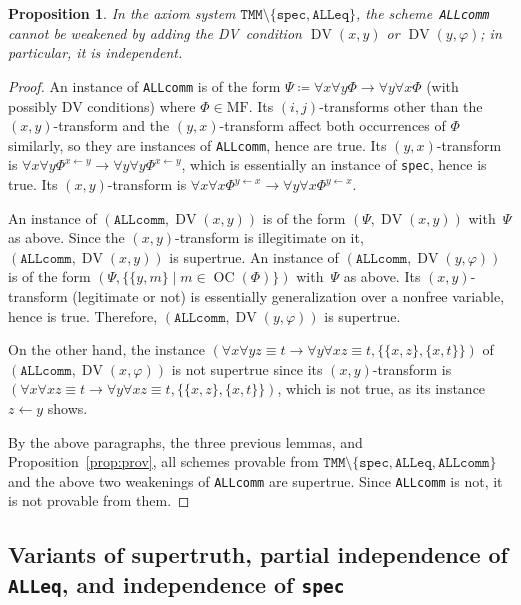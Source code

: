 \documentclass[11pt]{article}
\renewcommand*{\phi}{\varphi}
\newcommand*{\MF}{\mathrm{MF}}
\DeclareMathOperator{\DV}{DV}
\DeclareMathOperator{\OC}{OC}
\theoremstyle{plain}
\newtheorem{proposition}[theorem]{Proposition}
\theoremstyle{definition}
\theoremstyle{remark}
\begin{document}
\begin{proposition}\label{prop:ALLcomm}
In the axiom system $\texttt{TMM} \setminus \{\texttt{spec}, \texttt{ALLeq} \}$, the
scheme~\texttt{ALLcomm} cannot be weakened by adding the DV~condition $\DV(x, y)$ or $\DV(y, \phi)$;
in particular, it is independent.
\end{proposition}

\begin{proof}
An instance of \texttt{ALLcomm} is of the form
$\Psi \coloneqq \forall x \forall y \Phi \to \forall y \forall x \Phi$ (with possibly DV conditions)
where $\Phi \in \MF$.
Its $(i, j)$-transforms other than the $(x, y)$-transform and the $(y, x)$-transform affect
both occurrences of $\Phi$ similarly, so they are instances of \texttt{ALLcomm}, hence are true.
Its $(y, x)$-transform is
$\forall x \forall y \Phi^{x \leftarrow y} \to \forall y \forall y \Phi^{x \leftarrow y}$,
which is essentially an instance of \texttt{spec}, hence is true.
Its $(x, y)$-transform is
$\forall x \forall x \Phi^{y \leftarrow x} \to \forall y \forall x \Phi^{y \leftarrow x}$.

An instance of $(\texttt{ALLcomm}, \DV(x, y))$ is of the form $(\Psi, \DV(x, y))$ with~$\Psi$
as above.
Since the $(x, y)$-transform is illegitimate on it, $(\texttt{ALLcomm}, \DV(x, y))$ is supertrue.
An instance of $(\texttt{ALLcomm}, \DV(y, \phi))$ is of the form
$(\Psi, \{ \{y, m \} \mid m \in \OC(\Phi) \})$ with~$\Psi$ as above.
Its $(x, y)$-transform (legitimate or not) is essentially generalization over a nonfree variable,
hence is true.
Therefore, $(\texttt{ALLcomm}, \DV(y, \phi))$ is supertrue.

On the other hand, the instance
$(\forall x \forall y z \equiv t \to \forall y \forall x z \equiv t, \{\{x, z\}, \{x, t\}\})$
of $(\texttt{ALLcomm}, \DV(x, \phi))$ is not supertrue since its $(x, y)$-transform is
$(\forall x \forall x z \equiv t \to \forall y \forall x z \equiv t, \{\{x, z\}, \{x, t\}\})$,
which is not true, as its instance $z \leftarrow y$ shows.

By the above paragraphs, the three previous lemmas, and Proposition~\ref{prop:prov}, all schemes
provable from $\texttt{TMM} \setminus \{\texttt{spec}, \texttt{ALLeq}, \texttt{ALLcomm} \}$ and
the above two weakenings of \texttt{ALLcomm} are supertrue.
Since \texttt{ALLcomm} is not, it is not provable from them.
\end{proof}




\subsection{Variants of supertruth, partial independence of \texttt{ALLeq}, and independence of  \texttt{spec}}
\end{document}
